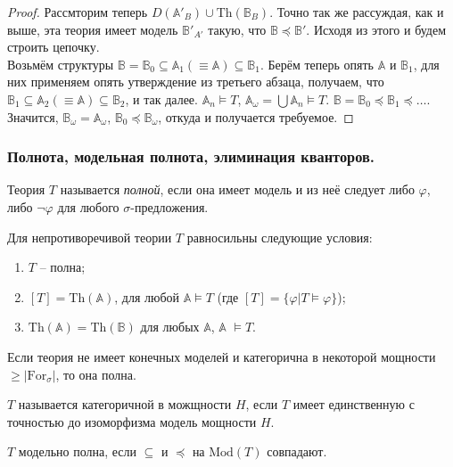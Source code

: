 \begin{proof}
    Рассмторим теперь $D(\mathbb{A}'_B) \cup \text{Th}(\mathbb{B}_B)$. Точно так же рассуждая, как и выше, эта теория имеет модель $\mathbb{B}'_{A'}$ такую, что $\mathbb{B} \preceq \mathbb{B}'$. Исходя из этого и будем строить цепочку. \\ 

    Возьмём структуры $\mathbb{B} = \mathbb{B}_0 \subseteq \mathbb{A}_1 (\equiv \mathbb{A}) \subseteq \mathbb{B}_1$. Берём теперь опять $\mathbb{A}$ и $\mathbb{B}_1$, для них применяем опять утверждение из третьего абзаца, получаем, что $\mathbb{B}_1 \subseteq \mathbb{A}_2 (\equiv \mathbb{A}) \subseteq \mathbb{B}_2$, и так далее. $\mathbb{A}_n \models T$, $\mathbb{A}_\omega = \bigcup \mathbb{A}_n \models T$. $\mathbb{B} = \mathbb{B}_0 \preceq \mathbb{B}_1 \preceq \ldots$. Значится, $\mathbb{B}_\omega = \mathbb{A}_\omega$, $\mathbb{B}_0 \preceq \mathbb{B}_\omega$, откуда и получается требуемое.
\end{proof}

\subsubsection{Полнота, модельная полнота, элиминация кванторов.} 

\begin{definition}
    Теория $T$ называется \textit{полной}, если она имеет модель и из неё следует либо $\varphi$, либо $\neg \varphi$ для любого $\sigma$-предложения.
\end{definition}

\begin{stat}
    Для непротиворечивой теории $T$ равносильны следующие условия: 

    \begin{enumerate}
        \item $T$ -- полна; 
        \item $[T] = \text{Th} (\mathbb{A})$, для любой $\mathbb{A} \models T$ (где $[T] = \{\varphi | T \models \varphi\}$); 
        \item $\text{Th}(\mathbb{A}) = \text{Th}(\mathbb{B})$ для любых $\mathbb{A}$, $\mathbb{A}$ $\models T$.
    \end{enumerate}
\end{stat}

\begin{theorem}
    Если теория не имеет конечных моделей и категорична в некоторой мощности $\geq |\text{For}_\sigma|$, то она полна.
\end{theorem}

\begin{definition}
    $T$ называется категоричной в можщности $H$, если $T$ имеет единственную с точностью до изоморфизма модель мощности $H$.
\end{definition}

\begin{definition}
    $T$ модельно полна, если $\subseteq$ и $\preceq$ на $\text{Mod}(T)$ совпадают.
\end{definition}